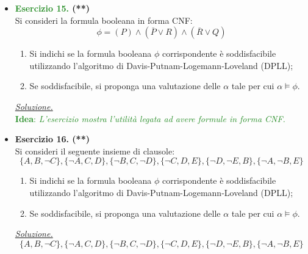\documentclass[a4paper,10pt]{article}
\makeatletter
\newcommand{\EsercitazioneNum}{11}
\newcommand{\Data}{28/11/2025}
\newcommand{\DocType}{Esercitazione} %
\newcommand{\FullTitle}{\DocType\ \EsercitazioneNum}
\newcommand{\Header}{
\noindent
  \small \textbf{Computabilità, Complessità e Logica - a.a. 2025/26} \hfill \textbf{\FullTitle} \\[0.2cm]
  \scriptsize Matteo Liotta, \texttt{matteo.liotta@studenti.units.it} \hfill \Data \\[0.2cm]
  \noindent\makebox[\linewidth]{\rule{\linewidth}{0.4pt}} \\[0.3cm]}
\newcommand{\NewPageHeader}{
  \vfill
  \noindent\makebox[\linewidth]{\rule{\linewidth}{0.4pt}}
  \newpage
  {\Header}
}
\makeatother
\begin{document}
{\begin{itemize}[label=, leftmargin=0pt]
    \NewPageHeader
    \textbf{\underline{Algoritmi di Soddisfacibilità: \textit{Davis-Putnam-Logemann-Loveland} (DPLL)}}

    \item \textbf{\textcolor{ForestGreen}{Esercizio 15.} (**)}\\ 	
    Si consideri la formula booleana in forma CNF:
    $$\phi = (P)\land(\overline P \lor R)\land (\overline R \lor Q)$$
    \begin{enumerate}
        \item Si indichi se la formula booleana $\phi$ corrispondente è soddisfacibile utilizzando l'algoritmo di Davis-Putnam-Logemann-Loveland (DPLL);
        \item Se soddisfacibile, si proponga una valutazione delle  $\alpha$ tale per cui $\alpha\models\phi$.
    \end{enumerate}

    \begin{osservazioni}
    \underline{\textit{Soluzione.}}\\
    \textcolor{ForestGreen}{\textbf{Idea}: \textit{L'esercizio mostra l'utilità legata ad avere formule in forma CNF.}}
    
    
    \end{osservazioni}
    

    \item \textbf{Esercizio 16. (**)}\\ 	
    Si consideri il seguente insieme di clausole:
    $$\{A, B, \lnot C\}, \{\lnot A, C, D\}, \{\lnot B, C, \lnot D\}, \{\lnot C, D, E\}, \{\lnot D, \lnot E, B\}, \{\lnot A, \lnot B, E\}$$
    \begin{enumerate}
        \item Si indichi se la formula booleana $\phi$ corrispondente è soddisfacibile utilizzando l'algoritmo di Davis-Putnam-Logemann-Loveland (DPLL);
        \item Se soddisfacibile, si proponga una valutazione delle  $\alpha$ tale per cui $\alpha\models\phi$.
    \end{enumerate}

    \begin{osservazioni}
    \underline{\textit{Soluzione.}}\\
    $$\{A, B, \lnot C\}, \{\lnot A, C, D\}, \{\lnot B, C, \lnot D\}, \{\lnot C, D, E\}, \{\lnot D, \lnot E, B\}, \{\lnot A, \lnot B, E\}$$\\
    

\end{osservazioni}
\end{itemize}}
\end{document}
